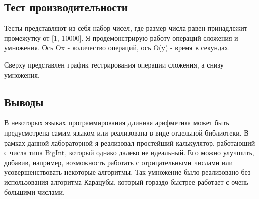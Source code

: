 \documentclass[12pt]{article}
\begin{document}
\subsection*{Тест производительности}

Тесты представляют из себя набор чисел, где размер числа равен принадлежит промежутку от [1, 10000]. Я продемонстрирую работу операций сложения и умножения. Ось Ox - количество операций, ось O(y) - время в секундах.



Сверху представлен график тестрирования операции сложения, а снизу умножения.

\subsection*{Выводы}

В некоторых языках программирования длинная арифметика может быть предусмотрена самим языком или реализована в виде отдельной библиотеки. В рамках данной лабораторной я реализовал простейший калькулятор, работающий с числа типа BigInt, который однако далеко не идеальный. Его можно улучшить, добавив, например, возможность работать с отрицательными числами или усовершенствовать некоторые алгоритмы. Так умножение было реализовано без использования алгоритма Карацубы, который гораздо быстрее работает с очень большими числами. 
\end{document}
